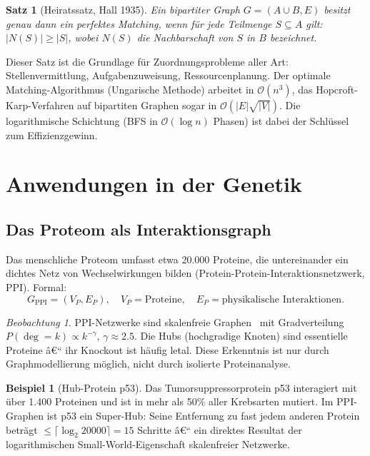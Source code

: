 ﻿\documentclass[12pt,a4paper,twoside]{article}
\theoremstyle{definition}
\newtheorem{beispiel}{Beispiel}[section]
\theoremstyle{plain}
\newtheorem{theorem}{Satz}[section]
\theoremstyle{remark}
\newtheorem{beobachtung}{Beobachtung}[section]
\begin{document}
\begin{theorem}[Heiratssatz, Hall 1935]
Ein bipartiter Graph $G = (A \cup B, E)$ besitzt genau dann
ein perfektes Matching, wenn für jede Teilmenge $S \subseteq A$
gilt: $|N(S)| \geq |S|$, wobei $N(S)$ die Nachbarschaft
von $S$ in $B$ bezeichnet.
\end{theorem}

Dieser Satz ist die Grundlage für Zuordnungsprobleme aller Art:
Stellenvermittlung, Aufgabenzuweisung, Ressourcenplanung.  Der
optimale Matching-Algorithmus (Ungarische Methode) arbeitet in
$\mathcal{O}(n^3)$, das Hopcroft-Karp-Verfahren auf bipartiten
Graphen sogar in $\mathcal{O}(|E| \sqrt{|V|})$.  Die logarithmische
Schichtung (BFS in $\mathcal{O}(\log n)$ Phasen) ist dabei der
Schlüssel zum Effizienzgewinn.

\section{Anwendungen in der Genetik}
\label{sec:genetik}

\subsection{Das Proteom als Interaktionsgraph}

Das menschliche Proteom umfasst etwa 20.000 Proteine, die
untereinander ein dichtes Netz von Wechselwirkungen bilden
(Protein-Protein-Interaktionsnetzwerk, PPI).  Formal:
\[
  G_{\text{PPI}} = (V_P, E_P), \quad
  V_P = \text{Proteine}, \quad
  E_P = \text{physikalische Interaktionen}.
\]

\begin{beobachtung}
PPI-Netzwerke sind skalenfreie Graphen~\cite{Barabasi1999} mit
Gradverteilung $P(\deg = k) \propto k^{-\gamma}$, $\gamma \approx 2.5$.
Die Hubs (hochgradige Knoten) sind essentielle Proteine â€“ ihr
Knockout ist häufig letal.  Diese Erkenntnis ist nur durch
Graphmodellierung möglich, nicht durch isolierte Proteinanalyse.
\end{beobachtung}

\begin{beispiel}[Hub-Protein p53]
Das Tumorsuppressorprotein p53 interagiert mit über 1.400
Proteinen und ist in mehr als 50\% aller Krebsarten mutiert.
Im PPI-Graphen ist p53 ein Super-Hub: Seine Entfernung zu
fast jedem anderen Protein beträgt $\leq \lceil\log_2 20000\rceil = 15$
Schritte â€“ ein direktes Resultat der logarithmischen
Small-World-Eigenschaft skalenfreier Netzwerke.
\end{beispiel}
\end{document}
